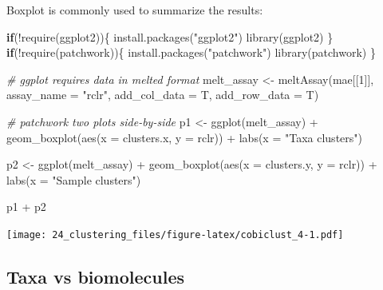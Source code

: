 \documentclass[
]{book}
\newenvironment{Shaded}{\begin{snugshade}}{\end{snugshade}}
\newcommand{\AttributeTok}[1]{\textcolor[rgb]{0.77,0.63,0.00}{#1}}
\newcommand{\CommentTok}[1]{\textcolor[rgb]{0.56,0.35,0.01}{\textit{#1}}}
\newcommand{\ControlFlowTok}[1]{\textcolor[rgb]{0.13,0.29,0.53}{\textbf{#1}}}
\newcommand{\DecValTok}[1]{\textcolor[rgb]{0.00,0.00,0.81}{#1}}
\newcommand{\FunctionTok}[1]{\textcolor[rgb]{0.00,0.00,0.00}{#1}}
\newcommand{\NormalTok}[1]{#1}
\newcommand{\OtherTok}[1]{\textcolor[rgb]{0.56,0.35,0.01}{#1}}
\newcommand{\SpecialCharTok}[1]{\textcolor[rgb]{0.00,0.00,0.00}{#1}}
\newcommand{\StringTok}[1]{\textcolor[rgb]{0.31,0.60,0.02}{#1}}
\begin{document}
Boxplot is commonly used to summarize the results:

\begin{Shaded}
\begin{Highlighting}[]
\ControlFlowTok{if}\NormalTok{(}\SpecialCharTok{!}\FunctionTok{require}\NormalTok{(ggplot2))\{}
    \FunctionTok{install.packages}\NormalTok{(}\StringTok{"ggplot2"}\NormalTok{)}
    \FunctionTok{library}\NormalTok{(ggplot2)}
\NormalTok{\}}
\ControlFlowTok{if}\NormalTok{(}\SpecialCharTok{!}\FunctionTok{require}\NormalTok{(patchwork))\{}
    \FunctionTok{install.packages}\NormalTok{(}\StringTok{"patchwork"}\NormalTok{)}
    \FunctionTok{library}\NormalTok{(patchwork)}
\NormalTok{\}}

\CommentTok{\# ggplot requires data in melted format}
\NormalTok{melt\_assay }\OtherTok{\textless{}{-}} \FunctionTok{meltAssay}\NormalTok{(mae[[}\DecValTok{1}\NormalTok{]], }\AttributeTok{assay\_name =} \StringTok{"rclr"}\NormalTok{, }\AttributeTok{add\_col\_data =}\NormalTok{ T, }\AttributeTok{add\_row\_data =}\NormalTok{ T)}

\CommentTok{\# patchwork two plots side{-}by{-}side}
\NormalTok{p1 }\OtherTok{\textless{}{-}} \FunctionTok{ggplot}\NormalTok{(melt\_assay) }\SpecialCharTok{+}
  \FunctionTok{geom\_boxplot}\NormalTok{(}\FunctionTok{aes}\NormalTok{(}\AttributeTok{x =}\NormalTok{ clusters.x, }\AttributeTok{y =}\NormalTok{ rclr)) }\SpecialCharTok{+}
  \FunctionTok{labs}\NormalTok{(}\AttributeTok{x =} \StringTok{"Taxa clusters"}\NormalTok{)}

\NormalTok{p2 }\OtherTok{\textless{}{-}} \FunctionTok{ggplot}\NormalTok{(melt\_assay) }\SpecialCharTok{+}
  \FunctionTok{geom\_boxplot}\NormalTok{(}\FunctionTok{aes}\NormalTok{(}\AttributeTok{x =}\NormalTok{ clusters.y, }\AttributeTok{y =}\NormalTok{ rclr)) }\SpecialCharTok{+}
  \FunctionTok{labs}\NormalTok{(}\AttributeTok{x =} \StringTok{"Sample clusters"}\NormalTok{)}

\NormalTok{p1 }\SpecialCharTok{+}\NormalTok{ p2}
\end{Highlighting}
\end{Shaded}

\texttt{[image: 24\_clustering\_files/figure-latex/cobiclust\_4-1.pdf]}

\hypertarget{taxa-vs-biomolecules}{%
\subsection{Taxa vs biomolecules}\label{taxa-vs-biomolecules}}
\end{document}
